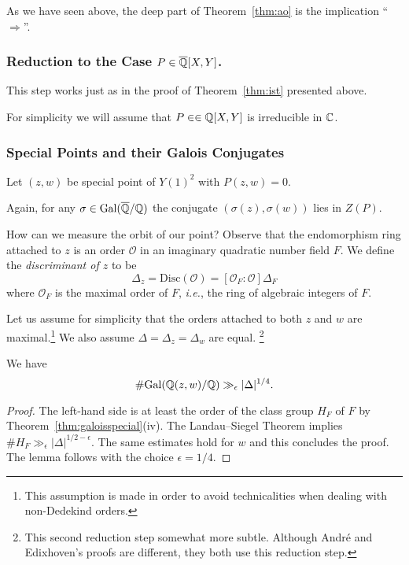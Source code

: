 As we have seen above, the deep part of Theorem~\ref{thm:ao} is the
implication
``$\Longrightarrow$''.

\subsubsection{Reduction to the Case $P \in {\overline{\mathbb{Q}}}[X,Y]$.}
This step works just as in the proof of Theorem~\ref{thm:ist}
presented above.

For simplicity we will assume that $P\in \in{\mathbb{Q}}[X,Y]$ is irreducible
in ${\mathbb{C}}$. 

\subsubsection{Special Points and their Galois Conjugates}

Let $(z,w)$ be special point of $Y(1)^2$ with $P(z,w)=0$.

Again, for any $\sigma\in \mathrm{Gal}({\overline{\mathbb{Q}}}/{\mathbb{Q}})$ the conjugate
$(\sigma(z),\sigma(w))$ lies in $Z(P)$.

How can we measure the orbit of our point? Observe that the
endomorphism ring attached to $z$ is an order $\mathcal{O}$ in an imaginary
quadratic number field $F$. We define the \emph{discriminant of $z$}
to be 
\begin{equation*}
  \Delta_z = \mathrm{Disc}(\mathcal{O}) = [\mathcal{O}_F:\mathcal{O}] \Delta_F
\end{equation*}
where $\mathcal{O}_F$ is the maximal order of $F$, \textit{i.e.}, the
ring of algebraic integers of $F$. 

Let us assume for simplicity that the orders attached to 
both $z$ and $w$ are maximal.\footnote{This assumption is made in
  order to avoid technicalities when dealing with non-Dedekind
  orders.}
We also assume $\Delta =
\Delta_z=\Delta_w$ are equal. \footnote{This second reduction step
  somewhat more subtle.
  Although Andr\'e and Edixhoven's proofs are different, they both use
  this reduction step.}

\begin{lemma}
  \label{lem:lgocm}
  We have
  \begin{equation*}
    \# \mathrm{Gal}({\mathbb{Q}}(z,w)/{\mathbb{Q}}) \gg_\epsilon
    |\Delta|^{1/4}. 
  \end{equation*}
\end{lemma}
\begin{proof}
  The left-hand side is at least the order of the class group $H_F$ of $F$ by
  Theorem~\ref{thm:galoisspecial}(iv). The Landau--Siegel Theorem
  implies $\# H_F \gg_\epsilon |\Delta|^{1/2-\epsilon}$. 
  The same estimates hold for $w$ and this concludes the proof.
  The lemma follows with the choice $\epsilon =1/4$. 
\end{proof}

